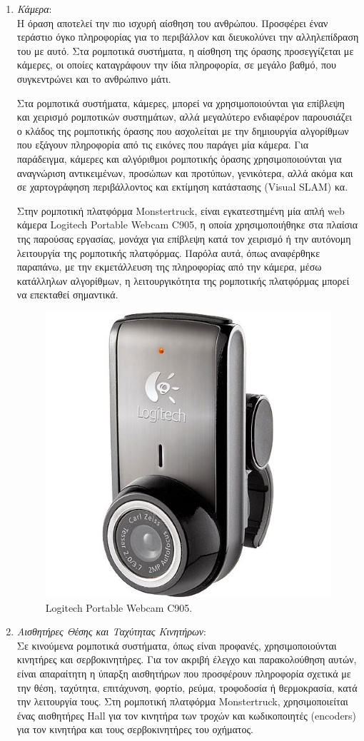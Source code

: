 \begin{enumerate}
\bigskip
\item \textit{Κάμερα}:\\
Η όραση αποτελεί την πιο ισχυρή αίσθηση του ανθρώπου. Προσφέρει έναν τεράστιο όγκο πληροφορίας για το περιβάλλον και διευκολύνει την αλληλεπίδραση του με αυτό. Στα ρομποτικά συστήματα, η αίσθηση της όρασης προσεγγίζεται με {κάμερες}, οι οποίες καταγράφουν την ίδια πληροφορία, σε μεγάλο βαθμό, που συγκεντρώνει και το ανθρώπινο μάτι.

Στα ρομποτικά συστήματα, {κάμερες}, μπορεί να χρησιμοποιούνται για επίβλεψη και χειρισμό ρομποτικών συστημάτων, αλλά μεγαλύτερο ενδιαφέρον παρουσιάζει ο κλάδος της {ρομποτικής όρασης} που ασχολείται με την δημιουργία αλγορίθμων που εξάγουν πληροφορία από τις εικόνες που παράγει μία {κάμερα}. Για παράδειγμα, {κάμερες} και αλγόριθμοι {ρομποτικής όρασης} χρησιμοποιούνται για αναγνώριση αντικειμένων, προσώπων και προτύπων, γενικότερα, αλλά ακόμα και σε χαρτογράφηση περιβάλλοντος και εκτίμηση κατάστασης   (Visual SLAM) κα.

Στην ρομποτική πλατφόρμα {Monstertruck}, είναι εγκατεστημένη μία απλή web κάμερα Logitech Portable Webcam C905, η οποία χρησιμοποιήθηκε στα πλαίσια της παρούσας εργασίας, μονάχα για επίβλεψη κατά τον χειρισμό ή την αυτόνομη λειτουργία της ρομποτικής πλατφόρμας. Παρόλα αυτά, όπως αναφέρθηκε παραπάνω, με την εκμετάλλευση της πληροφορίας από την κάμερα, μέσω κατάλληλων αλγορίθμων, η λειτουργικότητα της ρομποτικής πλατφόρμας μπορεί να επεκταθεί σημαντικά.

\begin{figure}[!ht]
	\centering
	\includegraphics[width=.3\linewidth]{Chapters/Chapter2/Figures/webcam.jpg}
	\caption{Logitech Portable Webcam C905.}
	\label{fig:webcam}
\end{figure}


\bigskip
\item \textit{Αισθητήρες Θέσης και Ταχύτητας Κινητήρων}:\\
Σε κινούμενα ρομποτικά συστήματα, όπως είναι προφανές, χρησιμοποιούνται κινητήρες και σερβοκινητήρες. Για τον ακριβή έλεγχο και παρακολούθηση αυτών, είναι απαραίτητη η ύπαρξη αισθητήρων που προσφέρουν πληροφορία σχετικά με την θέση, ταχύτητα, επιτάχυνση, φορτίο, ρεύμα, τροφοδοσία ή θερμοκρασία, κατά την λειτουργία τους. Στη ρομποτική πλατφόρμα {Monstertruck}, χρησιμοποιείται ένας {αισθητήρες Hall} για τον κινητήρα των τροχών και {κωδικοποιητές (encoders)} για τον κινητήρα και τους σερβοκινητήρες του οχήματος.


\end{enumerate}
